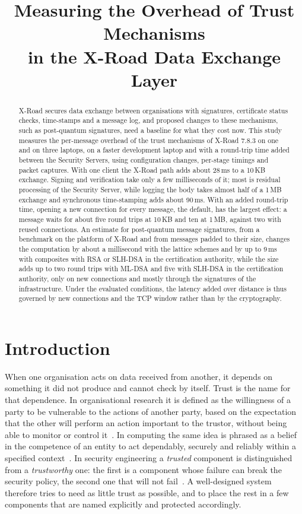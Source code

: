 \documentclass[conference,a4paper]{IEEEtran}
\title{Measuring the Overhead of Trust Mechanisms\\in the X-Road Data Exchange Layer}
\author{\IEEEauthorblockN{Ruslan Nechshadimov}}
\newcommand{\newtext}[1]{{\color{blue}#1}}
\begin{document}
\maketitle
\thispagestyle{plain}
\pagestyle{plain}

\begin{abstract}
\newtext{X-Road secures data exchange between organisations with signatures, certificate status
checks, time-stamps and a message log, and proposed changes to these mechanisms, such as post-quantum
signatures, need a baseline for what they cost now. This study measures the per-message overhead of
the trust mechanisms of X-Road 7.8.3 on one and on three laptops\newtext{, on a faster development laptop} and with a round-trip time added
between the Security Servers, using configuration changes, per-stage timings and packet captures. With one client the X-Road path
adds about 28\,ms to a 10\,KB exchange. Signing and verification take only a few milliseconds of it; most
is \newtext{residual processing} of the Security Server, while logging the body takes almost half of a 1\,MB
exchange and synchronous time-stamping adds about 90\,ms. With an added round-trip time, opening a
new connection for every message, the default, has the largest effect: a message waits for about
five round trips at 10\,KB and ten at 1\,MB, against two with reused connections.} \newtext{An
estimate for post-quantum message signatures, from a benchmark on the platform of X-Road and from
messages padded to their size, changes the computation by about a millisecond \newtext{with the
lattice schemes and by up to 9\,ms with composites with RSA or SLH-DSA in the certification
authority}, while the size adds up
to two round trips with ML-DSA and five with SLH-DSA in the certification authority, only on new
connections and mostly through the signatures of the infrastructure. Under the evaluated conditions,
the latency added over distance is thus governed by new connections and the TCP window rather than by
the cryptography.}
\end{abstract}

\section{Introduction}

When one organisation acts on data received from another, it depends on something it did not
produce and cannot check by itself. Trust is the name for that dependence. In organisational
research it is defined as the willingness of a party to be vulnerable to the
actions of another party, based on the expectation that the other will perform an action important
to the trustor, without being able to monitor or control it~\cite{mayer1995}. In computing the same
idea is phrased as a belief in the competence of an entity to act dependably, securely and reliably
within a specified context~\cite{grandison2000}. In security engineering a \emph{trusted} component
is distinguished from a \emph{trustworthy} one: the first is a component whose failure can break the
security policy, the second one that will not fail~\cite{anderson2020}. A well-designed system therefore
tries to need as little trust as possible, and to place the rest in a few components that are named
explicitly and protected accordingly.
\end{document}
